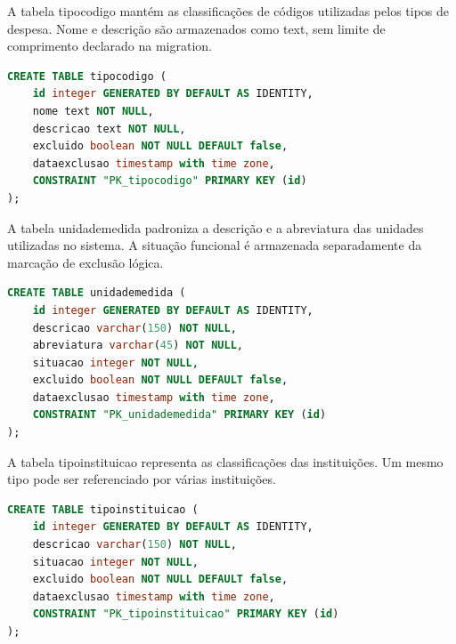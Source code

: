A tabela tipocodigo mantém as classificações de códigos utilizadas pelos tipos de despesa. Nome e descrição são armazenados como text, sem limite de comprimento declarado na migration.

\begin{quadro}[H]
\caption{Script de criação da tabela tipocodigo}\label{qua:bd-tipocodigo}
\begin{lstlisting}[language=SQL,breaklines=true,breakatwhitespace=false,frame=single,columns=fullflexible,basicstyle=\ttfamily\footnotesize]
CREATE TABLE tipocodigo (
    id integer GENERATED BY DEFAULT AS IDENTITY,
    nome text NOT NULL,
    descricao text NOT NULL,
    excluido boolean NOT NULL DEFAULT false,
    dataexclusao timestamp with time zone,
    CONSTRAINT "PK_tipocodigo" PRIMARY KEY (id)
);
\end{lstlisting}
\end{quadro}

A tabela unidademedida padroniza a descrição e a abreviatura das unidades utilizadas no sistema. A situação funcional é armazenada separadamente da marcação de exclusão lógica.

\begin{quadro}[H]
\caption{Script de criação da tabela unidademedida}\label{qua:bd-unidademedida}
\begin{lstlisting}[language=SQL,breaklines=true,breakatwhitespace=false,frame=single,columns=fullflexible,basicstyle=\ttfamily\footnotesize]
CREATE TABLE unidademedida (
    id integer GENERATED BY DEFAULT AS IDENTITY,
    descricao varchar(150) NOT NULL,
    abreviatura varchar(45) NOT NULL,
    situacao integer NOT NULL,
    excluido boolean NOT NULL DEFAULT false,
    dataexclusao timestamp with time zone,
    CONSTRAINT "PK_unidademedida" PRIMARY KEY (id)
);
\end{lstlisting}
\end{quadro}

A tabela tipoinstituicao representa as classificações das instituições. Um mesmo tipo pode ser referenciado por várias instituições.

\begin{quadro}[H]
\caption{Script de criação da tabela tipoinstituicao}\label{qua:bd-tipoinstituicao}
\begin{lstlisting}[language=SQL,breaklines=true,breakatwhitespace=false,frame=single,columns=fullflexible,basicstyle=\ttfamily\footnotesize]
CREATE TABLE tipoinstituicao (
    id integer GENERATED BY DEFAULT AS IDENTITY,
    descricao varchar(150) NOT NULL,
    situacao integer NOT NULL,
    excluido boolean NOT NULL DEFAULT false,
    dataexclusao timestamp with time zone,
    CONSTRAINT "PK_tipoinstituicao" PRIMARY KEY (id)
);
\end{lstlisting}
\end{quadro}

